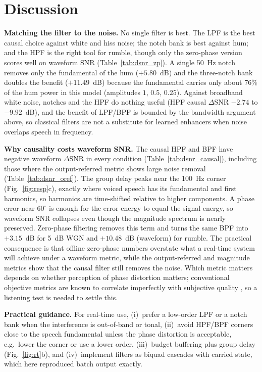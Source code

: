 \documentclass[conference]{IEEEtran}
\begin{document}
\section{Discussion}
\textbf{Matching the filter to the noise.} No single filter is best. The LPF is the best causal choice against white and hiss noise; the notch bank is best against hum; and the HPF is the right tool for rumble, though only the zero-phase version scores well on waveform SNR (Table~\ref{tab:dsnr_zp}). A single 50~Hz notch removes only the fundamental of the hum ($+5.80$~dB) and the three-notch bank doubles the benefit ($+11.49$~dB) because the fundamental carries only about 76\% of the hum power in this model (amplitudes $1$, $0.5$, $0.25$). Against broadband white noise, notches and the HPF do nothing useful (HPF causal $\Delta$SNR $-2.74$ to $-9.92$~dB), and the benefit of LPF/BPF is bounded by the bandwidth argument above, so classical filters are not a substitute for learned enhancers \cite{defossez2020real,hu2020dccrn,schroeter2022deepfilternet} when noise overlaps speech in frequency.

\textbf{Why causality costs waveform SNR.} The causal HPF and BPF have negative waveform $\Delta$SNR in every condition (Table~\ref{tab:dsnr_causal}), including those where the output-referred metric shows large noise removal (Table~\ref{tab:dsnr_oref}). The group delay peaks near the 100~Hz corner (Fig.~\ref{fig:resp}c), exactly where voiced speech has its fundamental and first harmonics, so harmonics are time-shifted relative to higher components. A phase error near $60^\circ$ is enough for the error energy to equal the signal energy, so waveform SNR collapses even though the magnitude spectrum is nearly preserved. Zero-phase filtering removes this term and turns the same BPF into $+3.15$~dB for 5~dB WGN and $+10.48$~dB (waveform) for rumble. The practical consequence is that offline zero-phase numbers overstate what a real-time system will achieve under a waveform metric, while the output-referred and magnitude metrics show that the causal filter still removes the noise. Which metric matters depends on whether perception of phase distortion matters; conventional objective metrics are known to correlate imperfectly with subjective quality \cite{reddy2020dns}, so a listening test is needed to settle this.

\textbf{Practical guidance.} For real-time use, (i)~prefer a low-order LPF or a notch bank when the interference is out-of-band or tonal, (ii)~avoid HPF/BPF corners close to the speech fundamental unless the phase distortion is acceptable, e.g.\ lower the corner or use a lower order, (iii)~budget buffering plus group delay (Fig.~\ref{fig:rt}b), and (iv)~implement filters as biquad cascades with carried state, which here reproduced batch output exactly.
\end{document}
